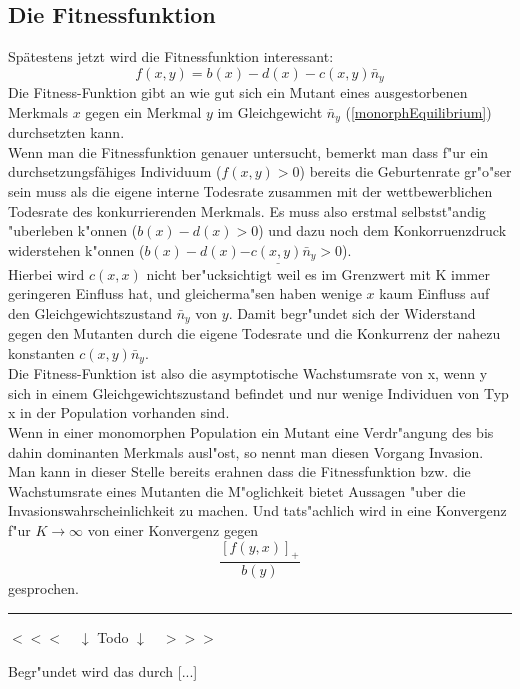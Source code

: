 \documentclass[11pt, a4paper, german]{article}
\theoremstyle{plain}
\begin{document}
	\subsection{Die Fitnessfunktion}
		Spätestens jetzt wird die Fitnessfunktion interessant:
		\[ f(x,y) = b(x) - d(x) - c(x,y)\bar{n}_y \]
		Die Fitness-Funktion gibt an wie gut sich ein Mutant eines ausgestorbenen Merkmals $ x $ gegen ein Merkmal $ y $ im Gleichgewicht $ \bar{n}_y $ (\ref{monorphEquilibrium}) durchsetzten kann. \\
		Wenn man die Fitnessfunktion genauer untersucht, bemerkt man dass f"ur ein durchsetzungsfähiges Individuum ($ f(x,y) > 0 $) bereits die Geburtenrate gr"o"ser sein muss als die eigene interne Todesrate zusammen mit der wettbewerblichen Todesrate des konkurrierenden Merkmals. Es muss also erstmal selbstst"andig "uberleben k"onnen ($ b(x) - d(x) > 0 $) und dazu noch dem Konkorruenzdruck widerstehen k"onnen ($ b(x) - d(x) \underline{- c(x,y)\bar{n}_y} > 0 $).\\
		Hierbei wird $ c(x,x) $ nicht ber"ucksichtigt weil es im Grenzwert mit K immer geringeren Einfluss hat, und gleicherma"sen haben wenige $ x  $ kaum Einfluss auf den Gleichgewichtszustand $ \bar{n}_y $ von $ y $. Damit begr"undet sich der Widerstand gegen den Mutanten durch die eigene Todesrate und die Konkurrenz der nahezu konstanten $ c(x,y)\bar{n}_y $. \\
		Die Fitness-Funktion ist also die asymptotische Wachstumsrate von x, wenn y sich in einem Gleichgewichtszustand befindet und nur wenige Individuen von Typ x in der Population vorhanden sind.\\
		Wenn in einer monomorphen Population ein Mutant eine Verdr"angung des bis dahin dominanten Merkmals ausl"ost, so nennt man diesen Vorgang Invasion.
		Man kann in dieser Stelle bereits erahnen dass die Fitnessfunktion bzw. die Wachstumsrate eines Mutanten die M"oglichkeit bietet Aussagen "uber die Invasionswahrscheinlichkeit zu machen. Und tats"achlich wird in \cite{Champagnat20061127} eine Konvergenz f"ur $ K \to \infty $ von einer Konvergenz gegen 
		\[ \frac{\left[ f(y,x)\right]_+ }{b(y)} \]
		gesprochen. \\
\noindent\rule{\textwidth}{2pt}
\begin{center}
	$ <<< \quad \downarrow $ Todo $ \downarrow \quad >>> $
\end{center}
		Begr"undet wird das durch [...]\\
	
\end{document}
